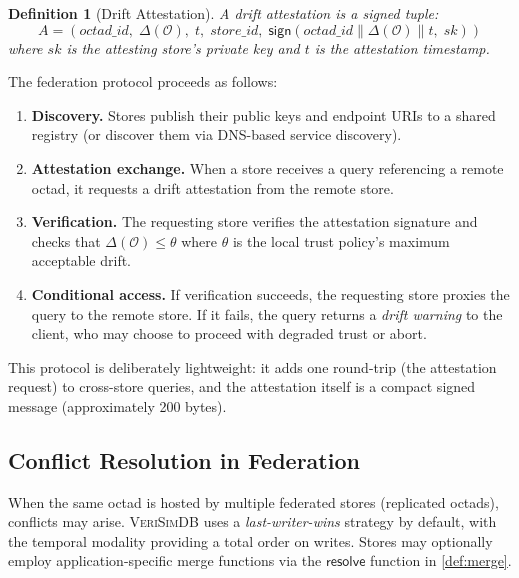 \documentclass[11pt,twocolumn]{article}
\newtheorem{definition}{Definition}[section]
\newcommand{\verisimdb}{\textsc{VeriSimDB}\xspace}
\newcommand{\octad}{\mathcal{O}}
\newcommand{\driftfn}{\Delta}
\begin{document}
\begin{definition}[Drift Attestation]\label{def:attestation}
A \emph{drift attestation} is a signed tuple:
\[
  A = (
    \mathit{octad\_id},\;
    \driftfn(\octad),\;
    t,\;
    \mathit{store\_id},\;
    \mathsf{sign}(\mathit{octad\_id} \| \driftfn(\octad) \| t,\; \mathit{sk})
  )
\]
where $\mathit{sk}$ is the attesting store's private key and $t$ is the
attestation timestamp.
\end{definition}

The federation protocol proceeds as follows:

\begin{enumerate}[leftmargin=*]
  \item \textbf{Discovery.}  Stores publish their public keys and endpoint
    URIs to a shared registry (or discover them via DNS-based service
    discovery).
  \item \textbf{Attestation exchange.}  When a store receives a query
    referencing a remote octad, it requests a drift attestation from the
    remote store.
  \item \textbf{Verification.}  The requesting store verifies the
    attestation signature and checks that $\driftfn(\octad) \leq \theta$
    where $\theta$ is the local trust policy's maximum acceptable drift.
  \item \textbf{Conditional access.}  If verification succeeds, the
    requesting store proxies the query to the remote store.  If it fails,
    the query returns a \emph{drift warning} to the client, who may
    choose to proceed with degraded trust or abort.
\end{enumerate}

This protocol is deliberately lightweight: it adds one round-trip (the
attestation request) to cross-store queries, and the attestation itself is
a compact signed message (approximately 200 bytes).

\subsection{Conflict Resolution in Federation}

When the same octad is hosted by multiple federated stores (replicated
octads), conflicts may arise.  \verisimdb uses a \emph{last-writer-wins}
strategy by default, with the temporal modality providing a total order on
writes.  Stores may optionally employ application-specific merge functions
via the $\mathsf{resolve}$ function in \cref{def:merge}.
\end{document}
